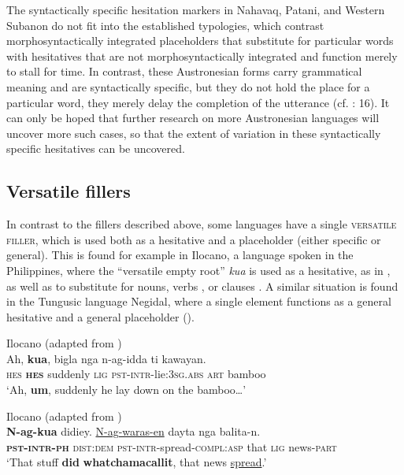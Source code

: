 \documentclass[output=paper]{langscibook}
\begin{document}
The syntactically specific hesitation markers in Nahavaq, Patani, and Western Subanon do not fit into the established typologies, which contrast morphosyntactically integrated placeholders that substitute for particular words with hesitatives that are not morphosyntactically integrated and function merely to stall for time. In contrast, these Austronesian forms carry grammatical meaning and are syntactically specific, but they do not hold the place for a particular word, they merely delay the completion of the utterance (cf. \citealt{Blake2020}: 16). It can only be hoped that further research on more Austronesian languages will uncover more such cases, so that the extent of variation in these syntactically specific hesitatives can be uncovered.

\subsection{Versatile fillers}\label{sec:intro:4.5}
\largerpage
In contrast to the fillers described above, some languages have a single \textsc{versatile} \textsc{filler}, which is used both as a hesitative and a placeholder (either specific or general). This is found for example in Ilocano, a language spoken in the Philippines, where the “versatile empty root” \textit{kua} is used as a hesitative, as in , as well as to substitute for nouns, verbs , or clauses  \citep{Rubino1996}. A similar situation is found in the Tungusic language Negidal, where a single element functions as a general hesitative and a general placeholder (\citealt{chapters/pakendorf}). 


\ea\label{ex:intro:12}
{Ilocano (adapted from \citealt[657]{Rubino1996})}\\
\gll Ah, \textbf{kua}, bigla nga n-ag-idda ti kawayan.\\
     \textsc{hes} \textbf{\textsc{hes}} suddenly \textsc{lig} \textsc{pst-intr-}lie\textsc{:3}\textsc{sg.abs} \textsc{art} bamboo\\
\glt ‘Ah, \textbf{um}, suddenly he lay down on the bamboo…’
\z

\ea\label{ex:intro:13}
{Ilocano (adapted from \citealt[659--660]{Rubino1996})}\\
\gll \textbf{N-ag-kua} didiey. \uline{N-ag-waras-en} dayta nga balita-n.\\
     \textbf{\textsc{pst-intr}}\textbf{{}-}\textbf{\textsc{ph}} \textsc{dist:dem} \textsc{pst-intr}{}-spread-\textsc{compl:asp} that \textsc{lig} news-\textsc{part}\\
\glt ‘That stuff \textbf{did} \textbf{whatchamacallit}, that news \uline {spread}.’ \\
\z
\end{document}
